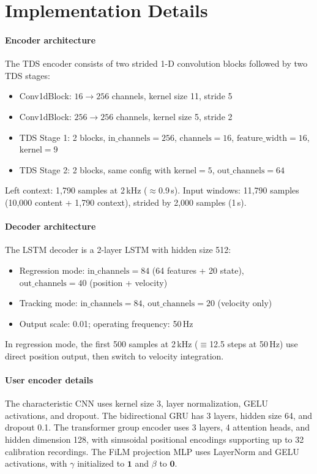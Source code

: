 \documentclass[conference]{IEEEtran}
\begin{document}
\appendices

\section{Implementation Details}
\label{app:implementation}

\paragraph{Encoder architecture}
The TDS encoder consists of two strided 1-D convolution blocks followed by two TDS stages:
\begin{itemize}[leftmargin=*,itemsep=1pt]
    \item Conv1dBlock: $16 \rightarrow 256$ channels, kernel size 11, stride 5
    \item Conv1dBlock: $256 \rightarrow 256$ channels, kernel size 5, stride 2
    \item TDS Stage 1: 2 blocks, $\text{in\_channels}{=}256$, $\text{channels}{=}16$, $\text{feature\_width}{=}16$, $\text{kernel}{=}9$
    \item TDS Stage 2: 2 blocks, same config with $\text{kernel}{=}5$, $\text{out\_channels}{=}64$
\end{itemize}
Left context: 1,790 samples at 2\,kHz ($\approx$0.9\,s). Input windows: 11,790 samples (10,000 content + 1,790 context), strided by 2,000 samples (1\,s).

\paragraph{Decoder architecture}
The LSTM decoder is a 2-layer LSTM with hidden size 512:
\begin{itemize}[leftmargin=*,itemsep=1pt]
    \item Regression mode: $\text{in\_channels}{=}84$ (64 features + 20 state), $\text{out\_channels}{=}40$ (position + velocity)
    \item Tracking mode: $\text{in\_channels}{=}84$, $\text{out\_channels}{=}20$ (velocity only)
    \item Output scale: 0.01; operating frequency: 50\,Hz
\end{itemize}
In regression mode, the first 500 samples at 2\,kHz ($\equiv$12.5 steps at 50\,Hz) use direct position output, then switch to velocity integration.

\paragraph{User encoder details}
The characteristic CNN uses kernel size 3, layer normalization, GELU activations, and dropout. The bidirectional GRU has 3 layers, hidden size 64, and dropout 0.1. The transformer group encoder uses 3 layers, 4 attention heads, and hidden dimension 128, with sinusoidal positional encodings supporting up to 32 calibration recordings. The FiLM projection MLP uses LayerNorm and GELU activations, with $\gamma$ initialized to $\mathbf{1}$ and $\beta$ to $\mathbf{0}$.
\end{document}

